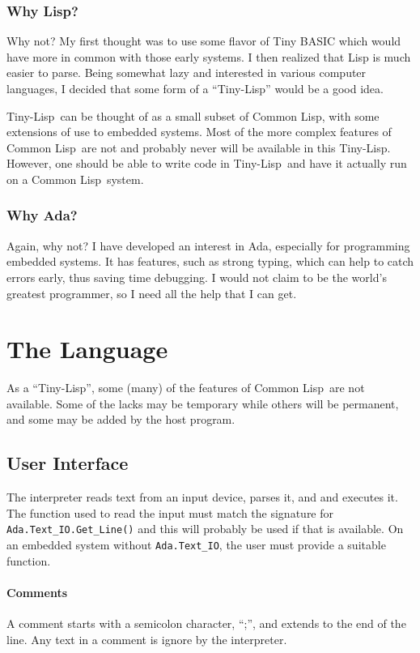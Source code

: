 \documentclass[10pt, openany]{book}
\newcommand{\package}[1]{\texttt{#1}}
\newcommand{\function}[1]{\texttt{#1}}
\newcommand{\tl}{Tiny-Lisp}
\newcommand{\cl}{Common Lisp}
\begin{document}
\subsection{Why Lisp?}
Why not?  My first thought was to use some flavor of Tiny BASIC which would have more in common with those early systems.  I then realized that Lisp is much easier to parse.  Being somewhat lazy and interested in various computer languages, I decided that some form of a ``\tl'' would be a good idea.

\tl\ can be thought of as a small subset of \cl, with some extensions of use to embedded systems.  Most of the more complex features of \cl\ are not and probably never will be available in this \tl.  However, one should be able to write code in \tl\ and have it actually run on a \cl\ system.

\subsection{Why Ada?}
Again, why not?  I have developed an interest in Ada, especially for programming embedded systems.  It has features, such as strong typing, which can help to catch errors early, thus saving time debugging.  I would not claim to be the world's greatest programmer, so I need all the help that I can get.

\chapter{The Language}
As a ``\tl'', some (many) of the features of \cl\ are not available.  Some of the lacks may be temporary while others will be permanent, and some may be added by the host program.

\section{User Interface}
The interpreter reads text from an input device, parses it, and and executes it.  The function used to read the input must match the signature for \function{Ada.Text\_IO.Get\_Line()} and this will probably be used if that is available.  On an embedded system without \package{Ada.Text\_IO}, the user must provide a suitable function.

\subsubsection{Comments}
A comment starts with a semicolon character, ``;'', and extends to the end of the line.  Any text in a comment is ignore by the interpreter.
\end{document}
